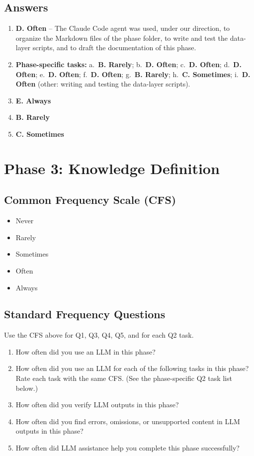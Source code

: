 \subsection*{Answers}
\begin{enumerate}
  \item[\textbf{Q1.}] \textbf{D. Often} -- The Claude Code agent was used, under our direction, to organize the Markdown files of the phase folder, to write and test the data-layer scripts, and to draft the documentation of this phase.
  \item[\textbf{Q2.}] \textbf{Phase-specific tasks:} a.\ \textbf{B. Rarely}; b.\ \textbf{D. Often}; c.\ \textbf{D. Often}; d.\ \textbf{D. Often}; e.\ \textbf{D. Often}; f.\ \textbf{D. Often}; g.\ \textbf{B. Rarely}; h.\ \textbf{C. Sometimes}; i.\ \textbf{D. Often} (other: writing and testing the data-layer scripts).
  \item[\textbf{Q3.}] \textbf{E. Always}
  \item[\textbf{Q4.}] \textbf{B. Rarely}
  \item[\textbf{Q5.}] \textbf{C. Sometimes}
\end{enumerate}

\section*{Phase 3: Knowledge Definition}

\subsection*{Common Frequency Scale (CFS)}
\begin{itemize}
  \item[A.] Never
  \item[B.] Rarely
  \item[C.] Sometimes
  \item[D.] Often
  \item[E.] Always
\end{itemize}

\subsection*{Standard Frequency Questions}
Use the CFS above for Q1, Q3, Q4, Q5, and for each Q2 task.
\begin{enumerate}
  \item[Q1.] How often did you use an LLM in this phase?
  \item[Q2.] How often did you use an LLM for each of the following tasks in this phase? Rate each task with the same CFS. (See the phase-specific Q2 task list below.)
  \item[Q3.] How often did you verify LLM outputs in this phase?
  \item[Q4.] How often did you find errors, omissions, or unsupported content in LLM outputs in this phase?
  \item[Q5.] How often did LLM assistance help you complete this phase successfully?
\end{enumerate}


